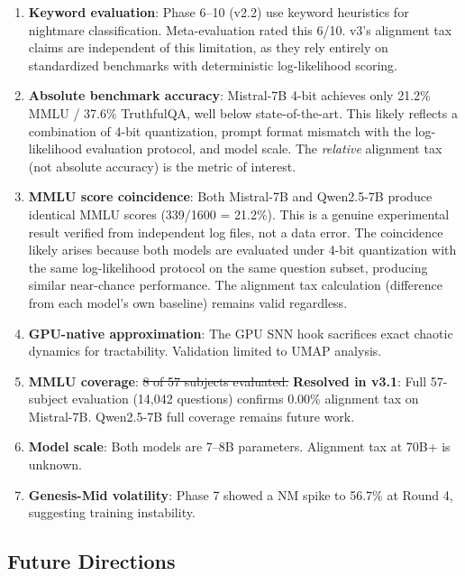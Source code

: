 \documentclass[11pt,a4paper]{article}
\begin{document}
\begin{enumerate}
    \item \textbf{Keyword evaluation}: Phase 6--10 (v2.2) use keyword heuristics for nightmare classification. Meta-evaluation rated this 6/10. v3's alignment tax claims are independent of this limitation, as they rely entirely on standardized benchmarks with deterministic log-likelihood scoring.
    \item \textbf{Absolute benchmark accuracy}: Mistral-7B 4-bit achieves only 21.2\% MMLU / 37.6\% TruthfulQA, well below state-of-the-art. This likely reflects a combination of 4-bit quantization, prompt format mismatch with the log-likelihood evaluation protocol, and model scale. The \emph{relative} alignment tax (not absolute accuracy) is the metric of interest.
    \item \textbf{MMLU score coincidence}: Both Mistral-7B and Qwen2.5-7B produce identical MMLU scores (339/1600 = 21.2\%). This is a genuine experimental result verified from independent log files, not a data error. The coincidence likely arises because both models are evaluated under 4-bit quantization with the same log-likelihood protocol on the same question subset, producing similar near-chance performance. The alignment tax calculation (difference from each model's own baseline) remains valid regardless.
    \item \textbf{GPU-native approximation}: The GPU SNN hook sacrifices exact chaotic dynamics for tractability. Validation limited to UMAP analysis.
    \item \textbf{MMLU coverage}: \sout{8 of 57 subjects evaluated.} \textbf{Resolved in v3.1}: Full 57-subject evaluation (14,042 questions) confirms $0.00\%$ alignment tax on Mistral-7B. Qwen2.5-7B full coverage remains future work.
    \item \textbf{Model scale}: Both models are 7--8B parameters. Alignment tax at 70B+ is unknown.
    \item \textbf{Genesis-Mid volatility}: Phase 7 showed a NM spike to 56.7\% at Round 4, suggesting training instability.
\end{enumerate}

\subsection{Future Directions}
\end{document}
